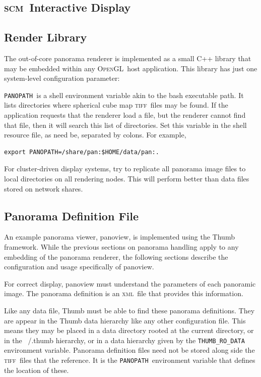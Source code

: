 \documentclass[oneside,11pt]{memoir}
\newcommand{\opengl}  {\textsc{OpenGL}}
\newcommand{\scm}     {\textsc{scm}}
\newcommand{\tiff}    {\textsc{tiff}}
\newcommand{\xml}     {\textsc{xml}}
\newcommand{\panopath}{\texttt{PANOPATH}}
\begin{document}
\begin{Spacing}{1.1}
\chapter{\scm\ Interactive Display}

\section{Render Library}

The out-of-core panorama renderer is implemented as a small C++ library that may be embedded within any \opengl\ host application. This library has just one system-level configuration parameter:

\panopath\ is a shell environment variable akin to the bash executable path. It lists directories where spherical cube map \tiff\ files may be found. If the application requests that the renderer load a file, but the renderer cannot find that file, then it will search this list of directories. Set this variable in the shell resource file, as need be, separated by colons. For example,

\begin{verbatim}
export PANOPATH=/share/pan:$HOME/data/pan:.
\end{verbatim}

For cluster-driven display systems, try to replicate all panorama image files to local directories on all rendering nodes. This will perform better than data files stored on network shares.

\section{Panorama Definition File}

An example panorama viewer, panoview, is implemented using the Thumb framework. While the previous sections on panorama handling apply to any embedding of the panorama renderer, the following sections describe the configuration and usage specifically of panoview.

For correct display, panoview must understand the parameters of each panoramic image. The panorama definition is an \xml\ file that provides this information.

Like any data file, Thumb must be able to find these panorama definitions. They are appear in the Thumb data hierarchy like any other configuration file. This means they may be placed in a data directory rooted at the current directory, or in the ~/.thumb hierarchy, or in a data hierarchy given by the \texttt{THUMB\_RO\_DATA} environment variable. Panorama definition files need not be stored along side the \tiff\ files that the reference. It is the \panopath\ environment variable that defines the location of these.


\end{Spacing}
\end{document}
